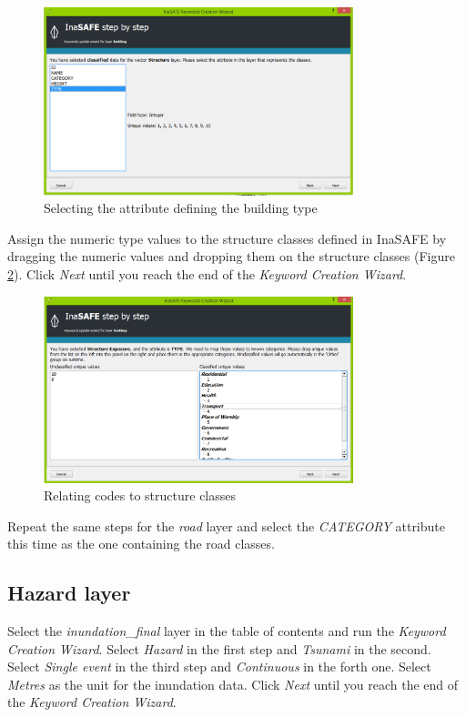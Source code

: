 \documentclass[a4paper,12pt,titlepage]{article}
\begin{document}
\begin{figure}[htb]
	\centering
	\includegraphics[width=9cm]{Images/keyword3.png}
	\caption{Selecting the attribute defining the building type}\label{fig:keyword3}
\end{figure}

Assign the numeric type values to the structure classes defined in InaSAFE by dragging the numeric values and dropping them on the structure classes (Figure \ref{fig:keyword4}). Click \textit{Next} until you reach the end of the \textit{Keyword Creation Wizard}.

\begin{figure}[htb]
	\centering
	\includegraphics[width=9cm]{Images/keyword4.png}
	\caption{Relating codes to structure classes}\label{fig:keyword4}
\end{figure}

Repeat the same steps for the \textit{road} layer and select the \textit{CATEGORY} attribute this time as the one containing the road classes.

\subsection{Hazard layer}

Select the \textit{inundation\_final} layer in the table of contents and run the \textit{Keyword Creation Wizard}. Select \textit{Hazard} in the first step and \textit{Tsunami} in the second. Select \textit{Single event} in the third step and \textit{Continuous} in the forth one. Select \textit{Metres} as the unit for the inundation data. Click \textit{Next} until you reach the end of the \textit{Keyword Creation Wizard}.
\end{document}
